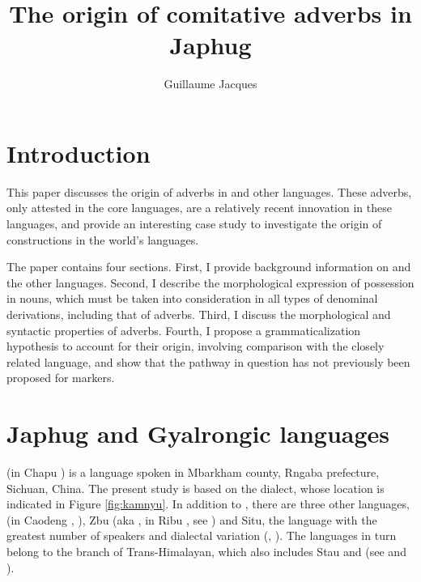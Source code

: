 \documentclass[output=paper]{langsci/langscibook}
\author{%
Guillaume Jacques\affiliation{CNRS-CRLAO-INALCO-EHESS (Paris)}
}
\title{The origin of comitative adverbs in Japhug}
\begin{document}
 

 
  

\section*{Introduction}
This paper discusses the origin of  adverbs in  and other  languages. These adverbs, only attested in the core  languages, are a relatively recent innovation in these languages, and provide an interesting case study to investigate the origin of  constructions in the world's languages.

The paper contains four sections.  First, I provide background information on  and the other  languages. Second, I describe the morphological expression of possession in  nouns, which must be taken into consideration in all types of denominal derivations, including that of  adverbs. Third, I discuss the morphological and syntactic properties of  adverbs. Fourth, I propose a grammaticalization hypothesis to account for their origin, involving comparison with the closely related  language, and show that the pathway in question has not previously been proposed for  markers.

 \section{Japhug and Gyalrongic languages} 
 (in  Chapu ) is a  language spoken in Mbarkham county, Rngaba prefecture, Sichuan, China. The present study is based on the  dialect, whose location is indicated in Figure \ref{fig:kamnyu}. In addition to , there are three other  languages,  (in  Caodeng , \citealt{jackson03caodeng}), Zbu (aka , in  Ribu , see \citealt{jackson04showu, gongxun14agreement}) and Situ, the language with the greatest number of speakers and dialectal variation (, \citealt{linxr93jiarongen, huangsun02, prins11kyomkyo}). The  languages in turn belong to the  branch of Trans-Himalayan, which also includes Stau and  (see \citealt{jackson00puxi} and \citealt{lai15person}).
\end{document}
